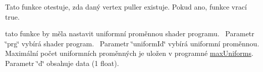 \begin{DoxyRefList}
\item[\label{todo__todo000016}%
\Hypertarget{todo__todo000016}%
Global \hyperlink{group__vertexpuller__tasks_ga09408b5ca4250292217f3330ae674319}{G\+PU\+:\+:is\+Vertex\+Puller} (Vertex\+Puller\+ID vao)]Tato funkce otestuje, zda daný vertex puller existuje. Pokud ano, funkce vrací true.  
\item[\label{todo__todo000023}%
\Hypertarget{todo__todo000023}%
Global \hyperlink{group__program__tasks_gaa9e9717db5520e6c34a1b380d6321758}{G\+PU\+:\+:program\+Uniform1f} (Program\+ID prg, uint32\+\_\+t uniform\+Id, float const \&d)]tato funkce by měla nastavit uniformní proměnnou shader programu.~\newline
 Parametr \char`\"{}prg\char`\"{} vybírá shader program.~\newline
 Parametr \char`\"{}uniform\+Id\char`\"{} vybírá uniformní proměnnou. Maximální počet uniformních proměnných je uložen v programné \hyperlink{fwd_8hpp_abb316cce98ea6938a7112c5f932d673f}{max\+Uniforms}.~\newline
 Parametr \char`\"{}d\char`\"{} obsahuje data (1 float).~\newline
  

\end{DoxyRefList}
